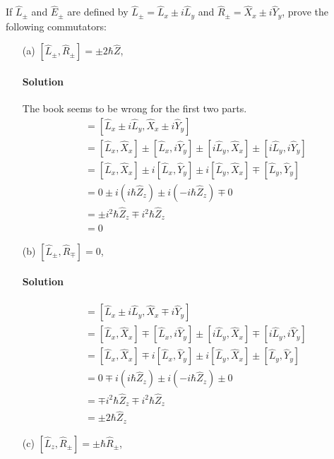 \documentclass{article}
\begin{document}
	If $\hat{L}_\pm$ and $\hat{E}_\pm$ are defined by $\hat{L}_\pm = \hat{L}_x \pm i\hat{L}_y$ and $\hat{R}_\pm = \hat{X}_x \pm i\hat{Y}_y$, prove the following commutators:
	\begin{enumerate}
		\item[(a)] $[\hat{L}_\pm, \hat{R}_\pm] = \pm 2\hbar \hat{Z}$,
		\paragraph{Solution} The book seems to be wrong for the first two parts.
		\begin{align}
			[\hat{L}_\pm, \hat{R}_\pm] &= [\hat{L}_x \pm i\hat{L}_y, \hat{X}_x \pm i\hat{Y}_y] \\
									   &= [\hat{L}_x,\hat{X}_x] \pm [\hat{L}_x,i\hat{Y}_y] \pm [i\hat{L}_y,\hat{X}_x] \pm [i\hat{L}_y,i\hat{Y}_y] \\
									   &= [\hat{L}_x,\hat{X}_x] \pm i[\hat{L}_x,\hat{Y}_y] \pm i[\hat{L}_y,\hat{X}_x] \mp [\hat{L}_y,\hat{Y}_y] \\
									   &= 0 \pm i(i\hbar\hat{Z}_z) \pm i(-i\hbar\hat{Z}_z) \mp 0 \\
									   &= \pm i^2\hbar\hat{Z}_z \mp i^2\hbar\hat{Z}_z \\
									   &= \boxed{0}
		\end{align}	
		
		\item[(b)] $[\hat{L}_\pm, \hat{R}_\mp] = 0$,
		\paragraph{Solution}
		\begin{align}
			[\hat{L}_\pm, \hat{R}_\mp] &= [\hat{L}_x \pm i\hat{L}_y, \hat{X}_x \mp i\hat{Y}_y] \\
									   &= [\hat{L}_x,\hat{X}_x] \mp [\hat{L}_x,i\hat{Y}_y] \pm [i\hat{L}_y,\hat{X}_x] \mp [i\hat{L}_y,i\hat{Y}_y] \\
									   &= [\hat{L}_x,\hat{X}_x] \mp i[\hat{L}_x,\hat{Y}_y] \pm i[\hat{L}_y,\hat{X}_x] \pm [\hat{L}_y,\hat{Y}_y] \\
									   &= 0 \mp i(i\hbar\hat{Z}_z) \pm i(-i\hbar\hat{Z}_z) \pm 0 \\
									   &= \mp i^2\hbar\hat{Z}_z \mp i^2\hbar\hat{Z}_z \\
									   &= \boxed{\pm 2\hbar\hat{Z}_z}
		\end{align}
		
		\item[(c)] $[\hat{L}_z, \hat{R}_\pm] = \pm \hbar \hat{R}_\pm$,

\end{enumerate}
\end{document}
